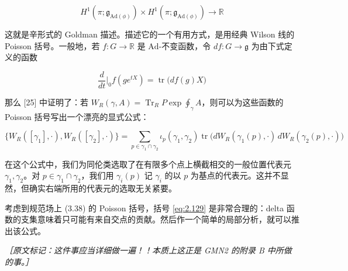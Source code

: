 \begin{equation}
  H^{1}(\pi;\mathfrak{g}_{\mathrm{Ad}(\phi)})\times H^{1}(\pi;\mathfrak{g}_{\mathrm{Ad}(\phi)})\to\mathbb{R}
  \tag{2.127}
  \label{eq:2.127}
\end{equation}

这就是辛形式的 Goldman 描述。描述它的一个有用方式，是用经典 Wilson 线的 Poisson 括号。一般地，若 $f:G\to\mathbb{R}$ 是 $\mathrm{Ad}$-不变函数，令 $df:G\to\mathfrak{g}$ 为由下式定义的函数

\begin{equation}
  \frac{d}{dt}\Big|_{0}f(ge^{tX})=\operatorname{tr}\big(df(g)X\big)
  \tag{2.128}
  \label{eq:2.128}
\end{equation}

那么 [25] 中证明了：若 $W_R(\gamma,A)=\operatorname{Tr}_R P\exp\oint_{\gamma}A$，则可以为这些函数的 Poisson 括号写出一个漂亮的显式公式：

\begin{equation}
  \{W_R([\gamma_1],\cdot),W_R([\gamma_2],\cdot)\}
  =\sum_{p\in\gamma_1\cap\gamma_2}\iota_p(\gamma_1,\gamma_2)\operatorname{tr}\big(dW_R(\gamma_1(p),\cdot)\,dW_R(\gamma_2(p),\cdot)\big)
  \tag{2.129}
  \label{eq:2.129}
\end{equation}

在这个公式中，我们为同伦类选取了在有限多个点上横截相交的一般位置代表元 $\gamma_1,\gamma_2$。对 $p\in\gamma_1\cap\gamma_2$，我们用 $\gamma_i(p)$ 记 $\gamma_i$ 的以 $p$ 为基点的代表元。这并不显然，但确实右端所用的代表元的选取无关紧要。

考虑到规范场上 (3.38) 的 Poisson 括号，括号 \eqref{eq:2.129} 是非常合理的：delta 函数的支集意味着只可能有来自交点的贡献。然后作一个简单的局部分析，就可以推出该公式。


{\small\itshape ［原文标记：这件事应当详细做一遍！！本质上这正是 GMN2 的附录 B 中所做的事。］}%

